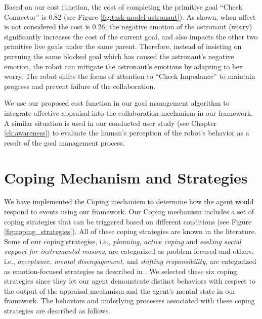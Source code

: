 \documentclass[12pt]{report}
\begin{document}
Based on our cost function, the cost of completing the primitive goal ``Check
Connector'' is 0.82 (see Figure \ref{fig:task-model-astronaut}). As shown, when
affect is not considered the cost is 0.26; the negative emotion of the astronaut
(worry) significantly increases the cost of the current goal, and also impacts
the other two primitive live goals under the same parent. Therefore, instead of
insisting on pursuing the same blocked goal which has caused the astronaut's
negative emotion, the robot can mitigate the astronaut's emotions by adapting to
her worry. The robot shifts the focus of attention to ``Check Impedance'' to
maintain progress and prevent failure of the collaboration.

We use our proposed cost function in our goal management algorithm to integrate
affective appraisal into the collaboration mechanism in our framework. A similar
situation is used in our conducted user study (see Chapter \ref{ch:awareness})
to evaluate the human's perception of the robot's behavior as a result of the
goal management process.

\section{Coping Mechanism and Strategies}
\label{sec:coping-mechanism}
We have implemented the Coping mechanism to determine how the agent would 
respond to events using our framework. Our Coping mechanism includes a set of
coping strategies that can be triggered based on different conditions (see
Figure \ref{fig:coping_strategies}). All of these coping strategies are known
in the literature. Some of our coping strategies, i.e., \textit{planning},
\textit{active coping} and \textit{seeking social support for instrumental
reasons}, are categorized as problem-focused and others, i.e.,
\textit{acceptance}, \textit{mental disengagement}, and \textit{shifting
responsibility}, are categorized as emotion-focused strategies as described in
\cite{gratch:domain-independent}. We selected these six coping strategies since
they let our agent demonstrate distinct behaviors with respect to the output of
the appraisal mechanism and the agent's mental state in our framework. The
behaviors and underlying processes associated with these coping strategies are described as follows.
\end{document}
